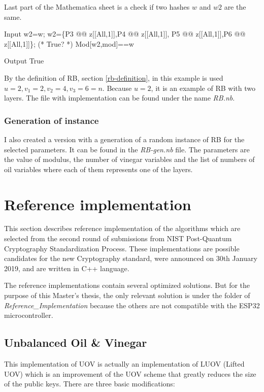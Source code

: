 \documentclass[thesis=M,english]{FITthesis}[2019/12/23]
\begin{document}
\bigskip
\noindent
Last part of the Mathematica sheet is a check if two hashes $w$ and $w2$ are the same.
\begin{mmaCell}[moredefined={w2, w, P5, P6, z, P4, P3, mod}]{Input}
w2=w;
w2=\{P3 @@ z[[All,1]],P4 @@ z[[All,1]],
P5 @@ z[[All,1]],P6 @@ z[[All,1]]\};
(* True? *)
Mod[w2,mod]==w
\end{mmaCell}
\begin{mmaCell}[addtoindex=2]{Output}
True
\end{mmaCell}
By the definition of RB, section \ref{rb-definition}, in this example is used $u=2, v_1=2, v_2=4, v_3=6=n$. Because $u=2$, it is an example of RB with two layers.
The file with implementation can be found under the name \textit{RB.nb}.

\subsubsection{Generation of instance}
I also created a version with a generation of a random instance of RB for the selected parameters. It can be found in the \textit{RB-gen.nb} file. The parameters are the value of modulus, the number of vinegar variables and the list of numbers of oil variables where each of them represents one of the layers.

\newpage
\lstset{basicstyle=\footnotesize\ttfamily}
\section{Reference implementation}
This section describes reference implementation of the algorithms which are selected from the second round of submissions from NIST Post-Quantum Cryptography Standardization Process.\cite{L-NIST-2ND} These implementations are possible candidates for the new Cryptography standard, were announced on 30th January 2019, and are written in C++ language.

\bigskip
\noindent
The reference implementations contain several optimized solutions. But for the purpose of this Master's thesis, the only relevant solution is under the folder of \textit{Reference\_Implementation} because the others are not compatible with the ESP32 microcontroller.

\subsection{Unbalanced Oil \& Vinegar}
This implementation of UOV is actually an implementation of LUOV (Lifted UOV) which is an improvement of the UOV scheme that greatly reduces the size of the public keys. There are three basic modifications:
\end{document}
